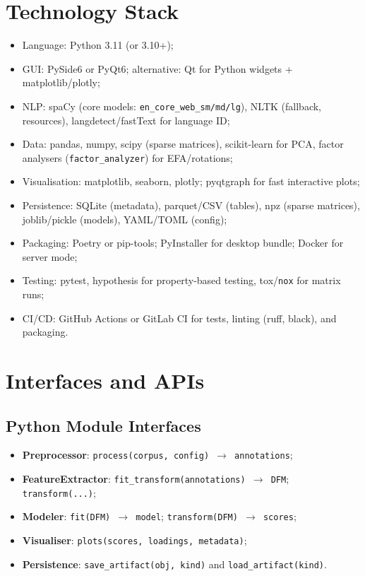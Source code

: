 \section{Technology Stack}
\begin{itemize}
    \item Language: Python 3.11 (or 3.10+);
    \item GUI: PySide6 or PyQt6; alternative: Qt for Python widgets + matplotlib/plotly;
    \item NLP: spaCy (core models: \texttt{en\_core\_web\_sm/md/lg}), NLTK (fallback, resources), langdetect/fastText for language ID;
    \item Data: pandas, numpy, scipy (sparse matrices), scikit-learn for PCA, factor analysers (\texttt{factor\_analyzer}) for EFA/rotations;
    \item Visualisation: matplotlib, seaborn, plotly; pyqtgraph for fast interactive plots;
    \item Persistence: SQLite (metadata), parquet/CSV (tables), npz (sparse matrices), joblib/pickle (models), YAML/TOML (config);
    \item Packaging: Poetry or pip-tools; PyInstaller for desktop bundle; Docker for server mode;
    \item Testing: pytest, hypothesis for property-based testing, tox/\texttt{nox} for matrix runs;
    \item CI/CD: GitHub Actions or GitLab CI for tests, linting (ruff, black), and packaging.
\end{itemize}

\section{Interfaces and APIs}
\subsection{Python Module Interfaces}
\begin{itemize}
    \item \textbf{Preprocessor}: \texttt{process(corpus, config) $\rightarrow$ annotations};
    \item \textbf{FeatureExtractor}: \texttt{fit\_transform(annotations) $\rightarrow$ DFM}; \texttt{transform(...)};
    \item \textbf{Modeler}: \texttt{fit(DFM) $\rightarrow$ model}; \texttt{transform(DFM) $\rightarrow$ scores};
    \item \textbf{Visualiser}: \texttt{plots(scores, loadings, metadata)};
    \item \textbf{Persistence}: \texttt{save\_artifact(obj, kind)} and \texttt{load\_artifact(kind)}.
\end{itemize}

